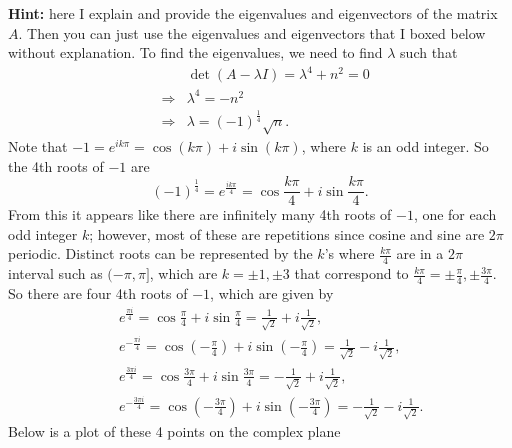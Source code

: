 \documentclass[11pt]{article}
\theoremstyle{definition}
\begin{document}
\begin{enumerate}[leftmargin=*]
\textbf{Hint:} here I explain and provide the eigenvalues and eigenvectors of the matrix $A$.   Then you can just use the eigenvalues and eigenvectors that I boxed below without explanation.  To find the eigenvalues, we need to find $\lambda$ such that 
\begin{eqnarray*}
& & \det(A-\lambda I)= \lambda^4+n^2=0\\
&\Rightarrow & \lambda^4=-n^2\\
& \Rightarrow & \lambda=(-1)^{\frac{1}{4}}\sqrt n.
\end{eqnarray*}
Note that $-1=e^{i k\pi}=\cos(k\pi)+i\sin(k\pi)$, where $k$ is an odd integer.  So the 4th roots of $-1$ are 
\[
(-1)^{\frac{1}{4}}=e^{\frac{i k\pi}{4}}=\cos\frac{k\pi}{4}+i\sin\frac{k\pi}{4}.
\]
From this it appears like there are infinitely many 4th roots of $-1$, one for each odd integer $k$; however, most of these are repetitions since cosine and sine are $2\pi$ periodic.  Distinct roots can be represented by the $k$'s where $\frac{k\pi}{4}$ are in a $2\pi$ interval such as  $(-\pi, \pi]$, which are $k=\pm 1, \pm 3$ that correspond to $\frac{k\pi}{4}=\pm \frac{\pi}{4}, \pm \frac{3\pi}{4}$.  So there are four 4th roots of $-1$, which are given by
\begin{eqnarray*}
& & e^{\frac{\pi i}{4}}=\cos \frac{\pi}{4}+i \sin \frac{\pi}{4}=\frac{1}{\sqrt 2}+i\frac{1}{\sqrt 2},\\
& &e^{-\frac{\pi i}{4}}=\cos\left(- \frac{\pi}{4}\right)+i \sin\left(- \frac{\pi}{4}\right)=\frac{1}{\sqrt 2}-i\frac{1}{\sqrt 2},\\
& & e^{\frac{3\pi i}{4}}=\cos \frac{3\pi}{4}+i \sin \frac{3\pi}{4}=-\frac{1}{\sqrt 2}+i\frac{1}{\sqrt 2},\\
&  & e^{-\frac{3 \pi i}{4}}=\cos\left(- \frac{3 \pi}{4}\right)+i \sin\left(- \frac{3\pi}{4}\right)=-\frac{1}{\sqrt 2}-i\frac{1}{\sqrt 2}.
\end{eqnarray*}
Below is a plot of these 4 points on the complex plane
\begin{center}
\end{center}
\end{enumerate}
\end{document}
